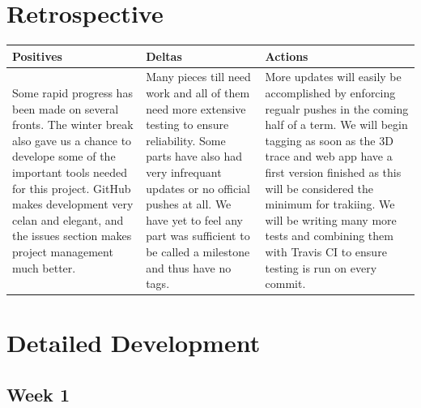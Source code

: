 \documentclass[onecolumn, draftclsnofoot,10pt, compsoc]{IEEEtran}
\begin{document}
\section {Retrospective}
\begin {center}
 \begin {tabular} { | p{5cm} | p{5cm} | p{5cm} | }
 \hline
 Positives & Deltas & Actions \\
 \hline
 Some rapid progress has been made on several fronts. The winter break also gave us a chance to develope some of the important tools needed for this project. GitHub makes development very celan and elegant, and the issues section makes project management much better. & Many pieces till need work and all of them need more extensive testing to ensure reliability. Some parts have also had very infrequant updates or no official pushes at all. We have yet to feel any part was sufficient to be called a milestone and thus have no tags. & More updates will easily be accomplished by enforcing regualr pushes in the coming half of a term. We will begin tagging as soon as the 3D trace and web app have a first version finished as this will be considered the minimum for trakiing. We will be writing many more tests and combining them with Travis CI to ensure testing is run on every commit.\\
 \hline
 \end {tabular}
\end {center} 
\section {Detailed Development}
\subsection {Week 1}
\end{document}
